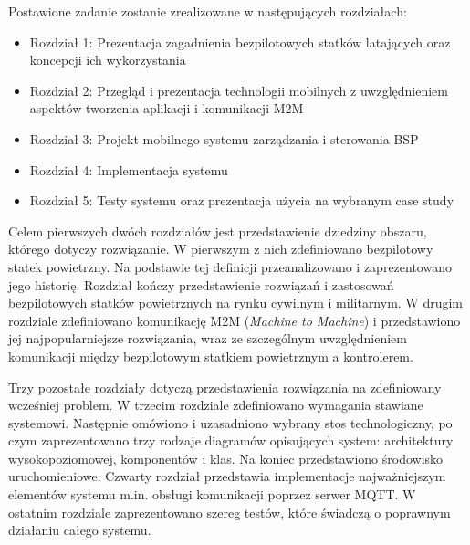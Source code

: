 Postawione zadanie zostanie zrealizowane w następujących rozdziałach:
\begin{itemize}
  \item Rozdział 1: Prezentacja zagadnienia bezpilotowych statków latających oraz koncepcji ich wykorzystania
  \item Rozdział 2: Przegląd i prezentacja technologii mobilnych z uwzględnieniem aspektów tworzenia aplikacji i komunikacji M2M
  \item Rozdział 3: Projekt mobilnego systemu zarządzania i sterowania BSP
  \item Rozdział 4: Implementacja systemu
  \item Rozdział 5: Testy systemu oraz prezentacja użycia na wybranym case study
\end{itemize}

Celem pierwszych dwóch rozdziałów jest przedstawienie dziedziny obszaru, którego dotyczy rozwiązanie. W pierwszym z nich zdefiniowano bezpilotowy statek powietrzny. Na podstawie tej definicji przeanalizowano i zaprezentowano jego historię. Rozdział kończy przedstawienie rozwiązań i zastosowań bezpilotowych statków powietrznych na rynku cywilnym i militarnym. W drugim rozdziale zdefiniowano komunikację M2M (\textit{Machine to Machine}) i przedstawiono jej najpopularniejsze rozwiązania, wraz ze szczególnym uwzględnieniem komunikacji między bezpilotowym statkiem powietrznym a kontrolerem.

Trzy pozostałe rozdziały dotyczą przedstawienia rozwiązania na zdefiniowany wcześniej problem. W trzecim rozdziale zdefiniowano wymagania stawiane systemowi. Następnie omówiono i uzasadniono wybrany stos technologiczny, po czym  zaprezentowano trzy rodzaje diagramów opisujących system: architektury wysokopoziomowej, komponentów i klas. Na koniec przedstawiono środowisko uruchomieniowe. Czwarty rozdział przedstawia implementacje najważniejszym elementów systemu m.in. obsługi komunikacji poprzez serwer MQTT. W ostatnim rozdziale zaprezentowano szereg testów, które świadczą o poprawnym działaniu całego systemu.



    


\clearpage

